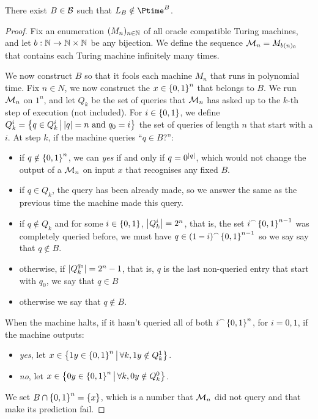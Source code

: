     \begin{claim}
        There exist $B \in \mathcal B$ such that $L_B \notin \Ptime^B$.
    \end{claim}
    \begin{proof}
        Fix an enumeration $(M_n)_{n \in \mathbb N}$ of all oracle compatible Turing machines,
        and let $b: \mathbb N \to \mathbb N \times \mathbb N$ be any bijection.
        We define the sequence $\mathcal{M}_n = M_{b(n)_0}$ that contains each Turing machine
        infinitely many times.

        We now construct $B$ so that it fools each machine $M_n$ that runs in
        polynomial time.
        Fix $n \in N$, we now construct the $x \in \left\{ 0, 1 \right\}^n$
        that belongs to $B$.
        We run $\mathcal{M}_n$ on $1^n$, and let $Q_k$ be the set of queries 
        that $\mathcal{M}_n$ has asked up to the $k$-th
        step of execution (not included).
        For $i \in \left\{ 0,1 \right\}$, we define $Q_k^i = \setst{q \in Q_k^i}{\abs{q} = n \andd q_0 = i}$
        the set of queries of length $n$ that start with a $i$.
        At step $k$, if the machine queries ``$q \in B$?'':
        \begin{itemize}
            \item if $q \notin \left\{ 0, 1 \right\}^n$, we can \textit{yes} if and only 
                if $q = 0^{\left| q \right|}$, which would not change the output of 
                a $\mathcal{M}_n$ on input $x$ that recognises any fixed $B$.
            \item if $q \in Q_k$, the query has been already made, so 
                we answer the same as the previous time the machine made this query.
            \item if $q \notin Q_k$ and for some $i \in \left\{ 0, 1 \right\}$, $\left| Q_k^i \right| = 2^n$, 
                that is, the set $i\concat \set{0, 1}^{n-1}$
                was completely queried before, we must have $q \in (1-i)\concat \set{0, 1}^{n-1}$
                so we say say that $q \notin B$.
            \item otherwise, if $\left| Q_k^{q_0} \right| = 2^n -1$, that is, 
                $q$ is the last non-queried entry that start with $q_0$,
                we say that $q \in B$
            \item otherwise we say that $q \notin B$.
        \end{itemize}

        When the machine halts, if it hasn't queried all of both
        $i \concat \set{0, 1}^{n}$, for $i = 0, 1$,
        if the machine outputs: \begin{itemize}
            \item \textit{yes},
                let $x \in \left\{ 1y \in \left\{ 0, 1 \right\}^n \, \middle| \, \forall k, 1y \notin Q_k^1 \right\}$.
            \item \textit{no},
                let $x \in \left\{ 0y \in \left\{ 0, 1 \right\}^n \, \middle| \, \forall k, 0y \notin Q_k^0 \right\}$.
        \end{itemize}
        We set $B \cap \left\{ 0, 1 \right\}^{n} = \left\{ x \right\}$, which is a number that $\mathcal{M}_n$
        did not query and that make its prediction fail.


\end{proof}
